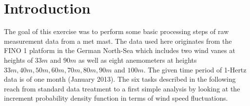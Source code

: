 \documentclass[10pt]{article}
\begin{document}




\onehalfspacing

\tableofcontents
\newpage
\section*{Introduction}
The goal of this exercise was to perform some basic processing steps of raw measurement data from a met mast. The data used here originates from the FINO 1 platform in the German North-Sea which includes two wind vanes at heights of $33m$ and $90m$ as well as eight anemometers at heights $33m, 40m, 50m, 60m, 70m, 80m, 90m$ and $100m$. The given time period of 1-Hertz data is of one month (January 2013). The six tasks described in the following reach from standard data treatment to a first simple analysis by looking at the increment probability density function in terms of wind speed fluctuations.
\end{document}
